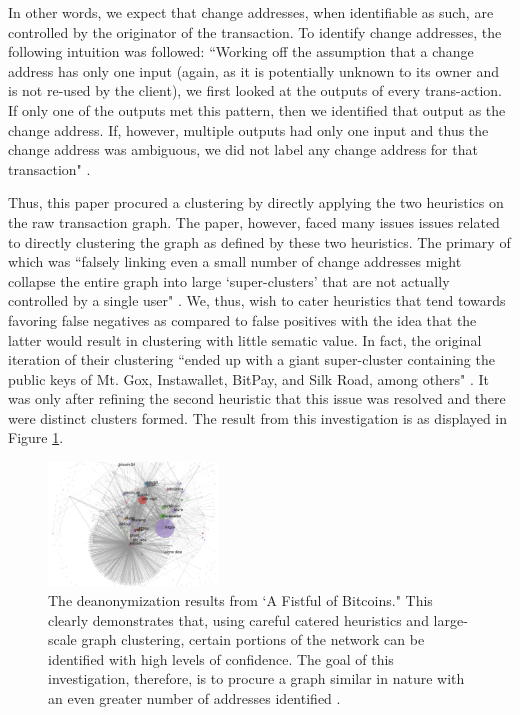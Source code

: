 \documentclass[journal]{IEEEtran}
\begin{document}
In other words, we expect that change addresses, when identifiable as such, are controlled by the originator of the transaction. To identify change addresses, the following intuition was followed: ``Working off the assumption that a change address has only one input (again,  as it is potentially unknown to its owner and is not re-used by the client), we first looked at the outputs of every trans-action. If only one of the outputs met this pattern, then we identified that output as the change address. If, however, multiple outputs had only one input and thus the change address was ambiguous, we did not label any change address for that transaction" \cite{fistful}.

Thus, this paper procured a clustering by directly applying the two heuristics on the raw transaction graph. The paper, however, faced many issues issues related to directly clustering the graph as defined by these two heuristics. The primary of which was ``falsely linking even a small number of change addresses might collapse the entire graph into large `super-clusters' that are not actually controlled by a single user" \cite{fistful}. We, thus, wish to cater heuristics that tend towards favoring false negatives as compared to false positives with the idea that the latter would result in clustering with little sematic value. In fact, the original iteration of their clustering ``ended up with a giant super-cluster containing the public keys of Mt. Gox, Instawallet, BitPay, and Silk Road, among others" \cite{fistful}. It was only after refining the second heuristic that this issue was resolved and there were distinct clusters formed. The result from this investigation is as displayed in Figure \ref{fig:fistful}. 

\begin{figure}
    \label{fig:fistful}
    \centering
    \includegraphics[width=0.4\textwidth]{fistful.png}
    \caption{The deanonymization results from `A Fistful of Bitcoins." This clearly demonstrates that, using careful catered heuristics and large-scale graph clustering, certain portions of the network can be identified with high levels of confidence. The goal of this investigation, therefore, is to procure a graph similar in nature with an even greater number of addresses identified \cite{fistful}.}
\end{figure}
\end{document}

